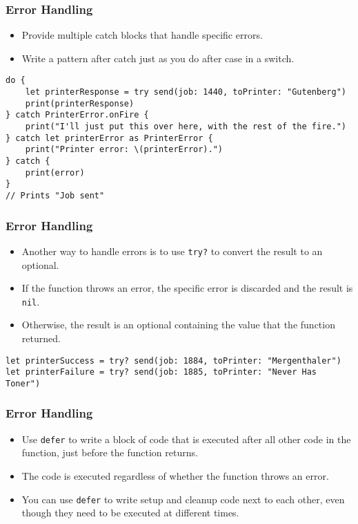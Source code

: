 \begin{frame}[fragile] \frametitle{Error Handling}

\begin{itemize}
\item Provide multiple catch blocks that handle specific errors. 
\item Write a pattern after catch just as you do after case in a switch.
\end{itemize}

\begin{lstlisting}
do {
    let printerResponse = try send(job: 1440, toPrinter: "Gutenberg")
    print(printerResponse)
} catch PrinterError.onFire {
    print("I'll just put this over here, with the rest of the fire.")
} catch let printerError as PrinterError {
    print("Printer error: \(printerError).")
} catch {
    print(error)
}
// Prints "Job sent"
\end{lstlisting}


\end{frame}

\begin{frame}[fragile] \frametitle{Error Handling}

\begin{itemize}
\item Another way to handle errors is to use \lstinline|try?| to convert the result to an optional. 
\item If the function throws an error, the specific error is discarded and the result is \lstinline|nil|. 
\item Otherwise, the result is an optional containing the value that the function returned.
\end{itemize}

\begin{lstlisting}
let printerSuccess = try? send(job: 1884, toPrinter: "Mergenthaler")
let printerFailure = try? send(job: 1885, toPrinter: "Never Has Toner")
\end{lstlisting}
\end{frame}

\begin{frame}[fragile] \frametitle{Error Handling}

\begin{itemize}
\item Use \lstinline|defer| to write a block of code that is executed after all other code in the function, just before the function returns. 
\item The code is executed regardless of whether the function throws an error. 
\item You can use \lstinline|defer| to write setup and cleanup code next to each other, even though they need to be executed at different times.
\end{itemize}

\end{frame}

